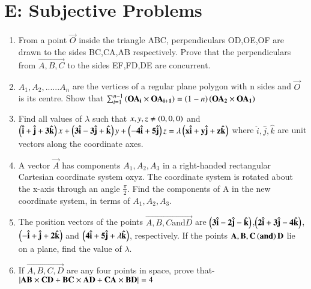\documentclass[journal,12pt,twocolumn]{IEEEtran}
\theoremstyle{remark}
\begin{document}
\section{E: Subjective Problems}
\begin{enumerate}
	\item From a point $\vec{O}$ inside the triangle ABC, perpendiculars OD,OE,OF are drawn to the sides BC,CA,AB respectively. Prove that the perpendiculars from $\vec{A,B,C}$ to the sides EF,FD,DE are concurrent. \hfill{}\\

	\item $A_1,A_2,......A_n$ are the vertices of a regular plane polygon with n sides and $\vec{O}$ is its centre. Show that
	$\sum_{i=1}^{n-1}\left(\mathbf{OA_i}\times\mathbf{OA_{i+1}}\right)= \left(1-n\right)\left(\mathbf{OA_2}\times\mathbf{OA_1}\right)$
		\hfill{}\\

	\item Find all values of $\lambda$ such that $x,y,z\neq\left(0,0,0\right)$ and $\left(\mathbf{\hat{i}+\hat{j}+3\hat{k}}\right)x+\left(\mathbf{3\hat{i}-3\hat{j}+\hat{k}}\right)y+\left(\mathbf{-4\hat{i}+5\hat{j}}\right)z=\lambda\left(\mathbf{x\hat{i}+y\hat{j}+z\hat{k}}\right)$ where $\hat{i},\hat{j},\hat{k}$ are unit vectors along the coordinate axes. \hfill{}\\

	\item A vector $\vec{A}$ has components $A_1,A_2,A_3$ in a right-handed rectangular Cartesian coordinate system oxyz. The coordinate system is rotated about the x-axis through an angle $\frac{\pi}{2}$. Find the components of A in the new coordinate system, in terms of $A_1,A_2,A_3$. \hfill{}\\

	\item The position vectors of the points $\vec{A,B,C \text{and} D}$ are $\mathbf{\left(3\hat{i}-2\hat{j}-\hat{k}\right)}$,$\mathbf{\left(2\hat{i}+3\hat{j}-4\hat{k}\right)}$,$\mathbf{\left(-\hat{i}+\hat{j}+2\hat{k}\right)}$ and $\mathbf{\left(4\hat{i}+5\hat{j}+\lambda\hat{k}\right)}$, respectively. If the points $\mathbf{A,B,C \left(and\right) D}$ lie on a plane, find the value of $\lambda$. \hfill{}\\

	\item If $\vec{A,B,C,D}$ are any four points in space, prove that- \hfill{}\\
		$\left\vert\mathbf{AB}\times\mathbf{CD}+\mathbf{BC}\times\mathbf{AD}+\mathbf{CA}\times\mathbf{BD}\right\vert=4$\\


\end{enumerate}
\end{document}
